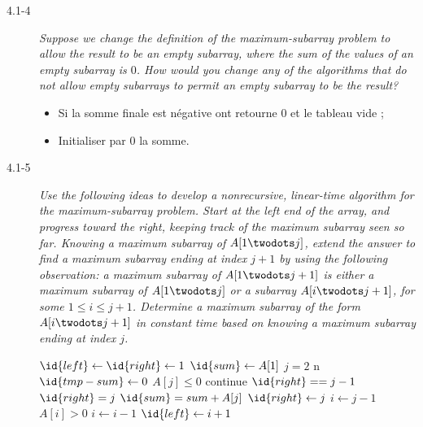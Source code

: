 \begin{description}
  \item[4.1-4] {\itshape Suppose we change the definition of the maximum-subarray problem to allow the result to be an empty subarray, where the sum of the values of an empty subarray is $0$. How would you change any of the algorithms that do not allow empty subarrays to permit an empty subarray to be the result?}

    \begin{ex} %
      \begin{itemize}
        \item Si la somme finale est n\'egative ont retourne $0$ et le tableau vide ;
        \item Initialiser par $0$ la somme.
      \end{itemize}
    \end{ex}

  \item[4.1-5] {\itshape Use the following ideas to develop a nonrecursive, linear-time algorithm for the maximum-subarray problem. Start at the left end of the array, and progress toward the right, keeping track of the maximum subarray seen so far. Knowing a maximum subarray of $A[1 \twodots j]$, extend the answer to find a maximum subarray ending at index $j+1$ by using the following observation: a maximum subarray of $A[1 \twodots j + 1]$ is either a maximum subarray of $A[1 \twodots j]$ or a subarray $A[i \twodots j + 1]$, for some $1 \le i \le j + 1$. Determine a maximum subarray of the form $A[i \twodots j + 1]$ in constant time based on knowing a maximum subarray ending at index $j$.}

    \begin{ex} %
      \begin{codebox}
        \li $\id{left} \gets \id{right} \gets 1$
        \li $\id{sum} \gets A[1]$
        \li \For $j = 2$ \To n \Do
        \li $\id{tmp-sum} \gets 0$
        \li \If $A[j] \le 0$ \Then
        \li continue
        \li \Else \If $\id{right} == j - 1$
        \li $\id{right} = j$
        \li $\id{sum} = sum + A[j]$
        \li \Else
        \li $\id{right} \gets j$
        \li $i \gets j - 1$
        \li \While $A[i] > 0$ \Then
        \li $i \gets i - 1$
        \li $\id{left} \gets i + 1$

      \end{codebox}
    \end{ex}

\end{description}

